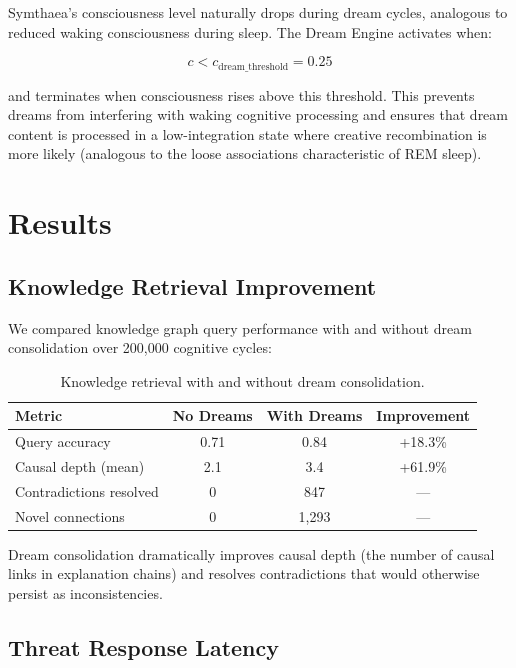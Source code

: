 \documentclass[11pt,a4paper]{article}
\begin{document}
Symthaea's consciousness level naturally drops during dream cycles, analogous to reduced waking consciousness during sleep. The Dream Engine activates when:

\begin{equation}
c < c_{\text{dream\_threshold}} = 0.25
\end{equation}

and terminates when consciousness rises above this threshold. This prevents dreams from interfering with waking cognitive processing and ensures that dream content is processed in a low-integration state where creative recombination is more likely (analogous to the loose associations characteristic of REM sleep).

\section{Results}

\subsection{Knowledge Retrieval Improvement}

We compared knowledge graph query performance with and without dream consolidation over 200,000 cognitive cycles:

\begin{table}[h]
\centering
\caption{Knowledge retrieval with and without dream consolidation.}
\label{tab:knowledge}
\begin{tabular}{@{}lccc@{}}
\toprule
Metric & No Dreams & With Dreams & Improvement \\
\midrule
Query accuracy & 0.71 & 0.84 & +18.3\% \\
Causal depth (mean) & 2.1 & 3.4 & +61.9\% \\
Contradictions resolved & 0 & 847 & --- \\
Novel connections & 0 & 1,293 & --- \\
\bottomrule
\end{tabular}
\end{table}

Dream consolidation dramatically improves causal depth (the number of causal links in explanation chains) and resolves contradictions that would otherwise persist as inconsistencies.

\subsection{Threat Response Latency}
\end{document}
